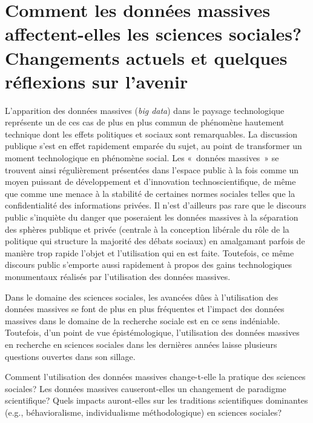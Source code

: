 \documentclass[
  letterpaper,
]{scrbook}
\begin{document}
\hypertarget{comment-les-donnuxe9es-massives-affectent-elles-les-sciences-sociales-changements-actuels-et-quelques-ruxe9flexions-sur-lavenir}{%
\section{Comment les données massives affectent-elles les sciences
sociales? Changements actuels et quelques réflexions sur
l'avenir}\label{comment-les-donnuxe9es-massives-affectent-elles-les-sciences-sociales-changements-actuels-et-quelques-ruxe9flexions-sur-lavenir}}

L'apparition des données massives (\emph{big data}) dans le paysage
technologique représente un de ces cas de plus en plus commun de
phénomène hautement technique dont les effets politiques et sociaux sont
remarquables. La discussion publique s'est en effet rapidement emparée
du sujet, au point de transformer un moment technologique en phénomène
social. Les «~données massives~» se trouvent ainsi régulièrement
présentées dans l'espace public à la fois comme un moyen puissant de
développement et d'innovation technoscientifique, de même que comme une
menace à la stabilité de certaines normes sociales telles que la
confidentialité des informations privées. Il n'est d'ailleurs pas rare
que le discours public s'inquiète du danger que poseraient les données
massives à la séparation des sphères publique et privée (centrale à la
conception libérale du rôle de la politique qui structure la majorité
des débats sociaux) en amalgamant parfois de manière trop rapide l'objet
et l'utilisation qui en est faite. Toutefois, ce même discours public
s'emporte aussi rapidement à propos des gains technologiques monumentaux
réalisés par l'utilisation des données massives.

Dans le domaine des sciences sociales, les avancées dûes à l'utilisation
des données massives se font de plus en plus fréquentes et l'impact des
données massives dans le domaine de la recherche sociale est en ce sens
indéniable. Toutefois, d'un point de vue épistémologique, l'utilisation
des données massives en recherche en sciences sociales dans les
dernières années laisse plusieurs questions ouvertes dans son sillage.

Comment l'utilisation des données massives change-t-elle la pratique des
sciences sociales? Les données massives causeront-elles un changement de
paradigme scientifique? Quels impacts auront-elles sur les traditions
scientifiques dominantes (e.g., béhavioralisme, individualisme
méthodologique) en sciences sociales?
\end{document}

